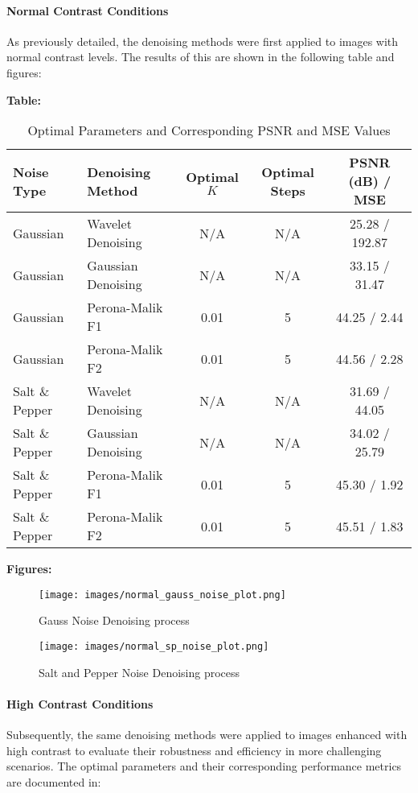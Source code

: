 \documentclass{article}
\begin{document}
\paragraph{Normal Contrast Conditions}
As previously detailed, the denoising methods were first applied to images with normal contrast levels. The results of this are shown in the following table and figures:

\textbf{Table:} 
\begin{table}[H]
\centering
\caption{Optimal Parameters and Corresponding PSNR and MSE Values}
\label{tab:optimal_parameters}
\begin{tabular}{llccc}
\hline
Noise Type & Denoising Method & Optimal \( K \) & Optimal Steps & PSNR (dB) / MSE \\ \hline
Gaussian & Wavelet Denoising & N/A & N/A & 25.28 / 192.87 \\
Gaussian & Gaussian Denoising & N/A & N/A & 33.15 / 31.47 \\
Gaussian & Perona-Malik F1 & 0.01 & 5 & 44.25 / 2.44 \\
Gaussian & Perona-Malik F2 & 0.01 & 5 & 44.56 / 2.28 \\
Salt \& Pepper & Wavelet Denoising & N/A & N/A & 31.69 / 44.05 \\
Salt \& Pepper & Gaussian Denoising & N/A & N/A & 34.02 / 25.79 \\
Salt \& Pepper & Perona-Malik F1 & 0.01 & 5 & 45.30 / 1.92 \\
Salt \& Pepper & Perona-Malik F2 & 0.01 & 5 & 45.51 / 1.83 \\ \hline
\end{tabular}
\end{table}


\textbf{Figures:} 
\begin{figure}[H]
    \centering
    \texttt{[image: images/normal\_gauss\_noise\_plot.png]}
    \caption{Gauss Noise Denoising process}
    \label{fig:denoising_1}
\end{figure}

\begin{figure}[H]
    \centering
    \texttt{[image: images/normal\_sp\_noise\_plot.png]}
    \caption{Salt and Pepper Noise Denoising process}
    \label{fig:denoising_2}
\end{figure}

\paragraph{High Contrast Conditions}
Subsequently, the same denoising methods were applied to images enhanced with high contrast to evaluate their robustness and efficiency in more challenging scenarios. The optimal parameters and their corresponding performance metrics are documented in:
\end{document}
